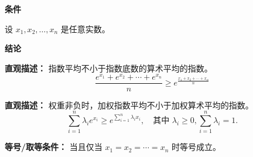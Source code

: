 \begin{statementbox}

\textbf{\textcolor{CStatement}{条件}}
\begin{description}[style=nextline, leftmargin=2.8em, labelsep=0.5em, itemsep=0.35em]
    \item[\textbf{\textcolor{CStatement}{条件 1（任意实数）：}}] 设 $x_1, x_2, \dots, x_n$ 是任意实数。
\end{description}

\textbf{\textcolor{CStatement}{结论}}
\begin{description}[style=nextline, leftmargin=2.8em, labelsep=0.5em, itemsep=0.45em]
    \item[\textbf{\textcolor{CStatement}{结论一（指数平均大）：}}]
    \textbf{\textcolor{CStatement}{直观描述：}} 指数平均不小于指数底数的算术平均的指数。
    \[
    \frac{e^{x_1}+e^{x_2}+\cdots+e^{x_n}}{n} \geq e^{\frac{x_1+x_2+\cdots+x_n}{n}}
    \]

    \item[\textbf{\textcolor{CStatement}{推广结论（加权形式）：}}]
    \textbf{\textcolor{CStatement}{直观描述：}} 权重非负时，加权指数平均不小于加权算术平均的指数。
    \[
    \sum_{i=1}^n \lambda_i e^{x_i} \geq e^{\sum_{i=1}^n \lambda_i x_i}, \quad \text{其中 } \lambda_i \geq 0, \sum_{i=1}^n \lambda_i = 1.
    \]
\end{description}

\textbf{\textcolor{CStatement}{等号/取等条件：}} 当且仅当 $x_1 = x_2 = \cdots = x_n$ 时等号成立。

\end{statementbox}
